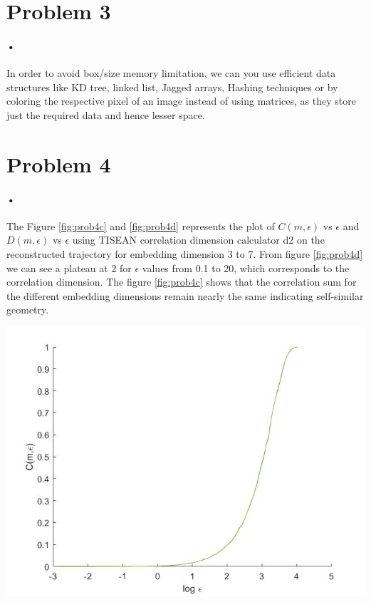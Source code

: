 \documentclass{article}
\begin{document}
\section*{Problem 3}
\paragraph{•}
In order to avoid box/size memory limitation, we can you use efficient data structures like KD tree, linked list, Jagged arrays, Hashing techniques or by coloring the respective pixel of an image instead of using matrices, as they store just the required data and hence lesser space.

\section*{Problem 4}
\paragraph{•}
The Figure \ref{fig:prob4c} and \ref{fig:prob4d} represents the plot of $C(m,\epsilon)$ vs $\epsilon$ and $D(m,\epsilon)$ vs $\epsilon$ using TISEAN correlation dimension calculator d2 on the reconstructed trajectory for embedding dimension 3 to 7. From figure \ref{fig:prob4d} we can see a plateau at 2 for $\epsilon$ values from 0.1 to 20, which corresponds to the correlation dimension. The figure \ref{fig:prob4c} shows that the correlation sum for the different embedding dimensions remain nearly the same indicating self-similar geometry.

\begin{minipage}{\linewidth}
{
\centering 
\includegraphics[scale=0.4]{images/prob4c.jpg}
\label{fig:prob4c}
}
\end{minipage}
\end{document}
